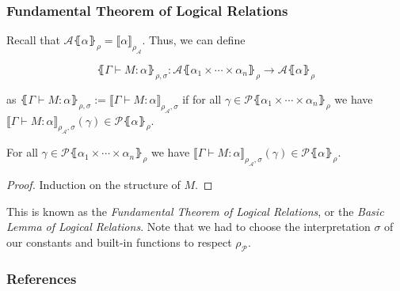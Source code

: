 \documentclass[aspectratio=169]{beamer}
\begin{document}
\begin{frame}
\frametitle{Fundamental Theorem of Logical Relations}

Recall that $\mathcal{A}\lBrace \alpha \rBrace_{\rho} = \llbracket\alpha \rrbracket_{\rho_{\mathcal{A}}}$.
Thus, we can define

\[
\lBrace \Gamma \vdash M : \alpha \rBrace_{\rho, \sigma} : \mathcal{A}\lBrace \alpha_1 \times \cdots \times \alpha_n \rBrace_\rho \to \mathcal{A}\lBrace \alpha \rBrace_\rho
\]

as $\lBrace \Gamma \vdash M : \alpha \rBrace_{\rho, \sigma} := \llbracket \Gamma \vdash M : \alpha \rrbracket_{\rho_{\mathcal{A}}, \sigma}$ if for all $\gamma \in \mathcal{P}\lBrace \alpha_1 \times \cdots \times \alpha_n \rBrace_\rho$ we have $\llbracket \Gamma \vdash M : \alpha \rrbracket_{\rho_{\mathcal{A}}, \sigma}(\gamma) \in \mathcal{P}\lBrace \alpha \rBrace_\rho$.

\medskip

\begin{theorem}
    For all $\gamma \in \mathcal{P}\lBrace \alpha_1 \times \cdots \times \alpha_n \rBrace_\rho$ we have $\llbracket \Gamma \vdash M : \alpha \rrbracket_{\rho_{\mathcal{A}}, \sigma}(\gamma) \in \mathcal{P}\lBrace \alpha \rBrace_\rho$.
    \begin{proof}
        Induction on the structure of $M$.
    \end{proof}
\end{theorem}

\medskip

This is known as the \emph{Fundamental Theorem of Logical Relations}, or the \emph{Basic Lemma of Logical Relations}.
Note that we had to choose the interpretation $\sigma$ of our constants and built-in functions to respect $\rho_{\mathcal{P}}$.
\end{frame}

\begin{frame}
\frametitle{References}

\printbibliography
\end{frame}
\end{document}
